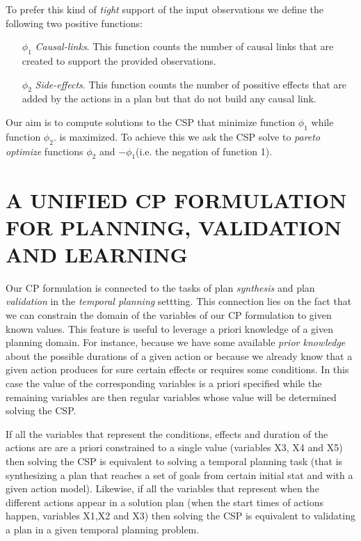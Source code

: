 \documentclass{ecai}
\begin{document}
To prefer this kind of {\em tight} support of the input observations we define the following two positive functions:
\begin{enumerate}
\item[$\phi_1$] {\em Causal-links}. This function counts the number of causal links that are created to support the provided observations.
\item[$\phi_2$] {\em Side-effects}. This function counts the number of possitive effects that are added by the actions in a plan but that do not build any causal link.  
\end{enumerate}

Our aim is to compute solutions to the CSP that minimize function $\phi_1$ while function $\phi_2$. is maximized. To achieve this we ask the CSP solve to {\em pareto optimize} functions $\phi_2$ and $-\phi_1$(i.e. the negation of function 1). 
  


\section{A UNIFIED CP FORMULATION FOR PLANNING, VALIDATION AND LEARNING}
\label{sec:usingCPValidation}
Our CP formulation is connected to the tasks of plan {\em synthesis} and plan {\em validation} in the {\em temporal planning} settting. This connection lies on the fact that we can constrain the domain of the variables of our CP formulation to given known values. This feature is useful to leverage a priori knowledge of a given planning domain. For instance, because we have some available {\em prior knowledge} about the possible durations of a given action or because we already know that a given action produces for sure certain effects or requires some conditions. In this case the value of the corresponding variables is a priori specified while the remaining variables are then regular variables whose value will be determined solving the CSP.

If all the variables that represent the conditions, effects and duration of the actions are are a priori constrained to a single value (variables X3, X4 and X5) then solving the CSP is equivalent to solving a temporal planning task (that is synthesizing a plan that reaches a set of goals from certain initial stat and with a given action model). Likewise, if all the variables that represent when the different actions appear in a solution plan (when the start times of actions happen, variables X1,X2 and X3) then solving the CSP is equivalent to validating a plan in a given temporal planning problem.
\end{document}
